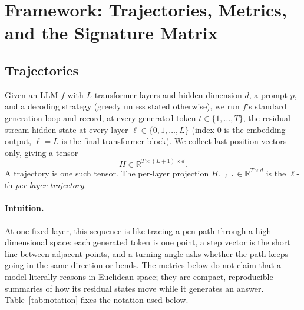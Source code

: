 \section{Framework: Trajectories, Metrics, and the Signature Matrix}
\label{sec:framework}

\subsection{Trajectories}

Given an LLM $f$ with $L$ transformer layers and hidden dimension $d$, a prompt $p$,
and a decoding strategy (greedy unless stated otherwise), we run $f$'s standard
generation loop and record, at every generated token $t \in \{1,\dots,T\}$, the
residual-stream hidden state at every layer
$\ell \in \{0, 1, \dots, L\}$ (index $0$ is the embedding output, $\ell{=}L$ is the
final transformer block). We collect last-position vectors only, giving a tensor
\begin{equation}
\label{eq:trajectory-tensor}
  H \in \mathbb{R}^{T \times (L+1) \times d}.
\end{equation}
A trajectory is one such tensor. The per-layer projection
$H_{:,\ell,:} \in \mathbb{R}^{T\times d}$ is the $\ell$-th \emph{per-layer
trajectory}.

\paragraph{Intuition.} At one fixed layer, this sequence is like tracing a pen
path through a high-dimensional space: each generated token is one point, a
step vector is the short line between adjacent points, and a turning angle asks
whether the path keeps going in the same direction or bends. The metrics below
do not claim that a model literally reasons in Euclidean space; they are compact,
reproducible summaries of how its residual states move while it generates an
answer.  Table~\ref{tab:notation} fixes the notation used below.

